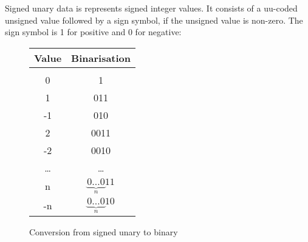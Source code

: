 Signed unary data is represents signed integer values. It consists of a
uu-coded unsigned value followed by a sign symbol, if the unsigned value
is non-zero. The sign symbol is 1 for positive and 0 for negative:

\begin{figure}[h]
\begin{tabular}{c|c}
Value & Binarisation \\
\hline\\
0     & 1\\
1     & 011\\
-1    & 010\\
2     & 0011\\
-2    & 0010\\
\dots & \dots\\
n     & $\underbrace{0\dots0}_n 11$\\
-n    & $\underbrace{0\dots0}_n 10$
\end{tabular}

\caption{Conversion from signed unary to binary}
\end{figure}

